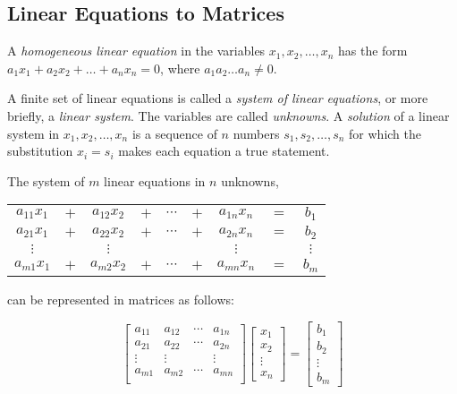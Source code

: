 \documentclass{report}
\begin{document}
		\subsection{Linear Equations to Matrices}
		
		\begin{defn}
			A \emph{homogeneous linear equation} in the variables $x_1,x_2,\dots,x_n$ has the form $a_1x_1+a_2x_2+\dots+a_nx_n=0$, where $a_1a_2\dots a_n\ne0$.
		\end{defn}
		
		A finite set of linear equations is called a \emph{system of linear equations}, or more briefly, a \emph{linear system}. The variables are called \emph{unknowns}. A \emph{solution} of a linear system in $x_1,x_2,\dots,x_n$ is a sequence of $n$ numbers $s_1,s_2,\dots,s_n$ for which the substitution $x_i=s_i$ makes each equation a true statement.
		
		The system of $m$ linear equations in $n$ unknowns,\\
		
		\begin{center}
		\begin{tabular}{ccccccccc}
			$a_{11}x_1$ & $+$ & $a_{12}x_2$ & $+$ & $\cdots$ & $+$ & $a_{1n}x_n$ & $=$ & $b_1$    \\
			$a_{21}x_1$ & $+$ & $a_{22}x_2$ & $+$ & $\cdots$ & $+$ & $a_{2n}x_n$ & $=$ & $b_2$    \\
			$\vdots$    &     & $\vdots$   &     &          &     & $\vdots$    &     & $\vdots$ \\
			$a_{m1}x_1$ & $+$ & $a_{m2}x_2$ & $+$ & $\cdots$ & $+$ & $a_{mn}x_n$ & $=$ & $b_m$   
		\end{tabular}
		\end{center}
		
		can be represented in matrices as follows:
		
		\begin{displaymath}
			\begin{bmatrix}
				a_{11} & a_{12} & \cdots & a_{1n} \\
				a_{21} & a_{22} & \cdots & a_{2n} \\
				\vdots & \vdots &        & \vdots \\
				a_{m1} & a_{m2} & \cdots & a_{mn} \\
			\end{bmatrix}
			\begin{bmatrix}
				x_1 \\ x_2 \\ \vdots \\ x_n
			\end{bmatrix}
			=
			\begin{bmatrix}
				b_1 \\ b_2 \\ \vdots \\ b_m
			\end{bmatrix}
		\end{displaymath}
		
\end{document}
